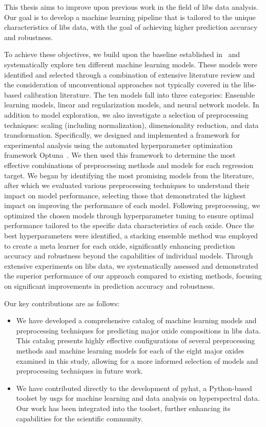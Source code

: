 This thesis aims to improve upon previous work in the field of \gls{libs} data analysis.
Our goal is to develop a machine learning pipeline that is tailored to the unique characteristics of \gls{libs} data, with the goal of achieving higher prediction accuracy and robustness.

To achieve these objectives, we build upon the baseline established in~\cite{p9_paper} and systematically explore ten different machine learning models.
These models were identified and selected through a combination of extensive literature review and the consideration of unconventional approaches not typically covered in the \gls{libs}-based calibration literature.
The ten models fall into three categories: Ensemble learning models, linear and regularization models, and neural network models.
In addition to model exploration, we also investigate a selection of preprocessing techniques: scaling (including normalization), dimensionality reduction, and data transformation.
Specifically, we designed and implemented a framework for experimental analysis using the automated hyperparameter optimization framework Optuna~\cite{optuna_2019}.
We then used this framework to determine the most effective combinations of preprocessing methods and models for each regression target.
We began by identifying the most promising models from the literature, after which we evaluated various preprocessing techniques to understand their impact on model performance, selecting those that demonstrated the highest impact on improving the performance of each model.
Following preprocessing, we optimized the chosen models through hyperparameter tuning to ensure optimal performance tailored to the specific data characteristics of each oxide.
Once the best hyperparameters were identified, a stacking ensemble method was employed to create a meta learner for each oxide, significantly enhancing prediction accuracy and robustness beyond the capabilities of individual models.
Through extensive experiments on \gls{libs} data, we systematically assessed and demonstrated the superior performance of our approach compared to existing methods, focusing on significant improvements in prediction accuracy and robustness.

Our key contributions are as follows:
\begin{itemize}
    \item We have developed a comprehensive catalog of machine learning models and preprocessing techniques for predicting major oxide compositions in \gls{libs} data. This catalog presents highly effective configurations of several preprocessing methods and machine learning models for each of the eight major oxides examined in this study, allowing for a more informed selection of models and preprocessing techniques in future work.
    \item We have contributed directly to the development of \gls{pyhat}, a Python-based toolset by \gls{usgs} for machine learning and data analysis on hyperspectral data. Our work has been integrated into the toolset, further enhancing its capabilities for the scientific community.
\end{itemize}


